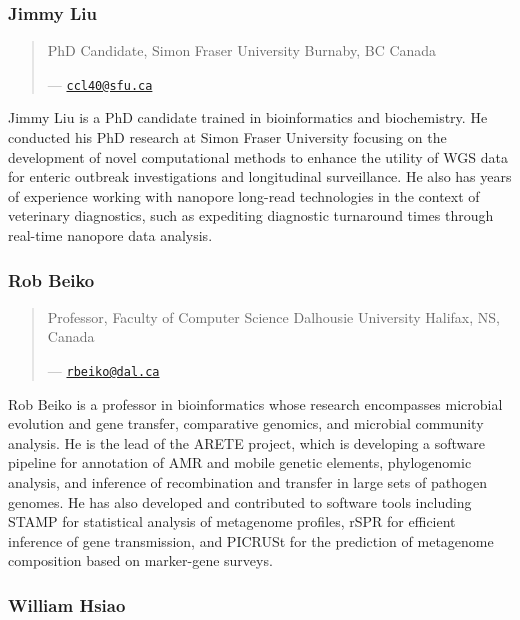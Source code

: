 \documentclass[
]{book}
\begin{document}
\subsubsection{Jimmy Liu}\label{jimmy-liu}

\begin{quote}
PhD Candidate, Simon Fraser University Burnaby, BC Canada

--- \href{mailto:ccl40@sfu.ca}{\nolinkurl{ccl40@sfu.ca}}
\end{quote}

Jimmy Liu is a PhD candidate trained in bioinformatics and biochemistry.
He conducted his PhD research at Simon Fraser University focusing on the
development of novel computational methods to enhance the utility of WGS
data for enteric outbreak investigations and longitudinal surveillance.
He also has years of experience working with nanopore long-read
technologies in the context of veterinary diagnostics, such as
expediting diagnostic turnaround times through real-time nanopore data
analysis.

\subsubsection{Rob Beiko}\label{rob-beiko}

\begin{quote}
Professor, Faculty of Computer Science Dalhousie University
Halifax, NS, Canada

--- \href{mailto:rbeiko@dal.ca}{\nolinkurl{rbeiko@dal.ca}}
\end{quote}

Rob Beiko is a professor in bioinformatics whose research encompasses
microbial evolution and gene transfer, comparative genomics, and
microbial community analysis. He is the lead of the ARETE project, which
is developing a software pipeline for annotation of AMR and mobile
genetic elements, phylogenomic analysis, and inference of recombination
and transfer in large sets of pathogen genomes. He has also developed
and contributed to software tools including STAMP for statistical
analysis of metagenome profiles, rSPR for efficient inference of gene
transmission, and PICRUSt for the prediction of metagenome composition
based on marker-gene surveys.

\subsubsection{William Hsiao}\label{william-hsiao}
\end{document}
